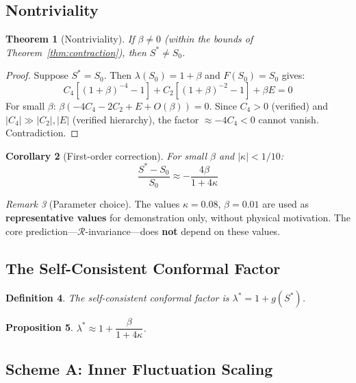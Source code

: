 \documentclass[11pt,a4paper]{article}
\newtheorem{theorem}{Theorem}[section]
\newtheorem{proposition}[theorem]{Proposition}
\newtheorem{corollary}[theorem]{Corollary}
\newtheorem{definition}[theorem]{Definition}
\theoremstyle{remark}
\newtheorem{remark}[theorem]{Remark}
\newcommand{\R}{\mathcal{R}}
\begin{document}
\subsection{Nontriviality}

\begin{theorem}[Nontriviality]
\label{thm:nontrivial}
If $\beta \neq 0$ (within the bounds of Theorem~\ref{thm:contraction}), then $S^* \neq S_0$.
\end{theorem}

\begin{proof}
Suppose $S^* = S_0$. Then $\lambda(S_0) = 1 + \beta$ and $F(S_0) = S_0$ gives:
\[
  C_4[(1+\beta)^{-4}-1] + C_2[(1+\beta)^{-2}-1] + \beta E = 0
\]
For small $\beta$: $\beta(-4C_4 - 2C_2 + E + O(\beta)) = 0$. Since $C_4 > 0$ (verified) and $|C_4| \gg |C_2|, |E|$ (verified hierarchy), the factor $\approx -4C_4 < 0$ cannot vanish. Contradiction.
\end{proof}

\begin{corollary}[First-order correction]
For small $\beta$ and $|\kappa| < 1/10$:
\[
  \frac{S^* - S_0}{S_0} \approx -\frac{4\beta}{1 + 4\kappa}
\]
\end{corollary}

\begin{remark}[Parameter choice]
The values $\kappa = 0.08$, $\beta = 0.01$ are used as \textbf{representative values} for demonstration only, without physical motivation. The core prediction---$\R$-invariance---does \textbf{not} depend on these values.
\end{remark}

\subsection{The Self-Consistent Conformal Factor}

\begin{definition}
The self-consistent conformal factor is $\lambda^* = 1 + g(S^*)$.
\end{definition}

\begin{proposition}
$\lambda^* \approx 1 + \dfrac{\beta}{1+4\kappa}$.
\end{proposition}

\subsection{Scheme A: Inner Fluctuation Scaling}
\end{document}
